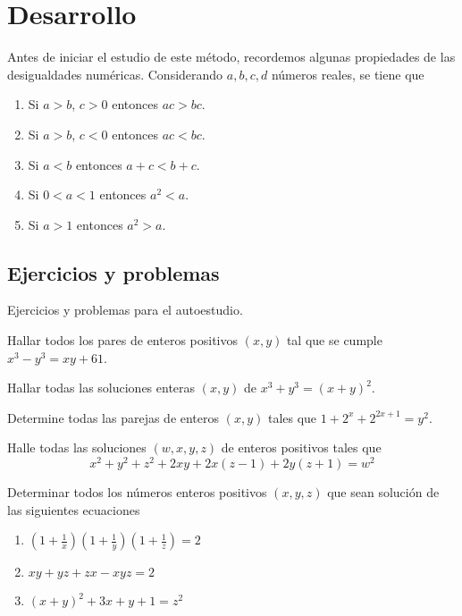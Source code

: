 \section{Desarrollo}

Antes de iniciar el estudio de este método, recordemos algunas propiedades de las desigualdades numéricas.
Considerando $a, b, c, d$ números reales, se tiene que
\begin{enumerate}
    \item Si $a > b$, $c > 0$ entonces $ac > bc$.
    \item Si $a > b$, $c < 0$ entonces $ac < bc$.
    \item Si $a < b$ entonces $a + c < b + c$.
    \item Si $0 < a < 1$ entonces $a^2 < a$.
    \item Si $a > 1$ entonces $a^2 > a$.
\end{enumerate}

\subsection{Ejercicios y problemas}

Ejercicios y problemas para el autoestudio.

\begin{exercise}
    Hallar todos los pares de enteros positivos $(x,y)$ tal que se cumple $x^3 - y^3 = xy + 61$.
\end{exercise}

\begin{exercise}
    Hallar todas las soluciones enteras $(x,y)$ de $x^3 + y^3 = (x + y)^2$.
\end{exercise}

\begin{exercise}
    Determine todas las parejas de enteros $(x, y)$ tales que $1 + 2^x + 2^{2x + 1} = y^2$.
\end{exercise}

\begin{exercise}
    Halle todas las soluciones $(w,x,y,z)$ de enteros positivos tales que
    \[
        x^2 + y^2 + z^2 + 2xy + 2x(z - 1) + 2y(z + 1) = w^2
    \]
\end{exercise}

\begin{exercise}
    Determinar todos los números enteros positivos $(x,y,z)$ que sean solución de las siguientes ecuaciones
    \begin{enumerate}
        \item $\left(1 + \frac{1}{x}\right)\left(1 + \frac{1}{y}\right)\left(1 + \frac{1}{z}\right) = 2$
        \item $xy + yz + zx - xyz = 2$
        \item $(x + y)^2 + 3x + y + 1 = z^2$
    \end{enumerate}
\end{exercise}

